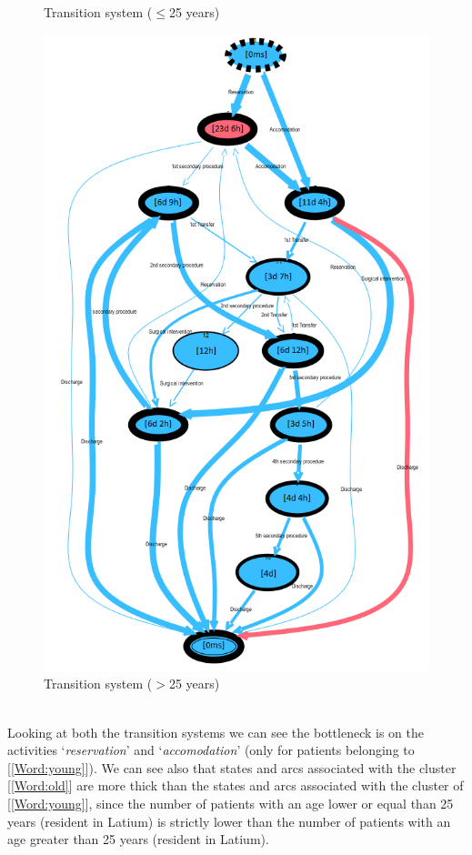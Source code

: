 \begin{figure} [htbp]
\begin{minipage}[t]{0.3\textwidth}
\caption{Transition system ($\leq$25 years)}
\end{minipage}
\begin{minipage}[t]{0.55\textwidth}
\includegraphics[width=\textwidth]{RicoveriTransitionSystemSojournOlds}
\caption{Transition system ($>$25 years)}
\end{minipage}
\end{figure}\\
Looking at both the transition systems we can see the bottleneck is on the activities `\textit{reservation}' and `\textit{accomodation}' (only for patients belonging to [\ref{Word:young}]). We can see also that states and arcs associated with the cluster [\ref{Word:old}] are more thick than the states and arcs associated with the cluster of [\ref{Word:young}], since the number of patients with an age lower or equal than 25 years (resident in Latium) is strictly lower than the number of patients with an age greater than 25 years (resident in Latium).
\clearpage
\noindent
